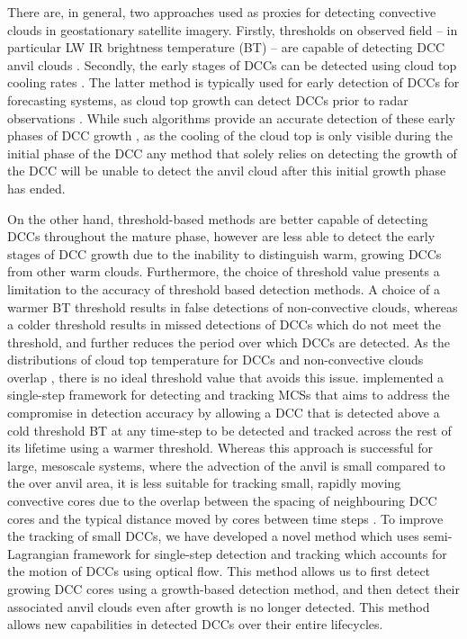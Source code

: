 There are, in general, two approaches used as proxies for detecting convective clouds in geostationary satellite imagery. 
Firstly, thresholds on observed field -- in particular LW IR brightness temperature (BT) -- are capable of detecting DCC anvil clouds \citep[e.g.][]{schmetz_monitoring_1997, hong_detection_2005, schroder_deep_2009, liang_integrated_2017, senf_size-resolved_2018}.
Secondly, the early stages of DCCs can be detected using cloud top cooling rates \citep{zinner_cb-tram:_2008, bedka_objective_2010, muller_novel_2019}.
The latter method is typically used for early detection of DCCs for forecasting systems, as cloud top growth can detect DCCs prior to radar observations \citep{roberts_nowcasting_2003}.
While such algorithms provide an accurate detection of these early phases of DCC growth \citep{zinner_validation_2013}, as the cooling of the cloud top is only visible during the initial phase of the DCC any method that solely relies on detecting the growth of the DCC will be unable to detect the anvil cloud after this initial growth phase has ended.

On the other hand, threshold-based methods are better capable of detecting DCCs throughout the mature phase, however are less able to detect the early stages of DCC growth due to the inability to distinguish warm, growing DCCs from other warm clouds.
Furthermore, the choice of threshold value presents a limitation to the accuracy of threshold based detection methods.
A choice of a warmer BT threshold results in false detections of non-convective clouds, whereas a colder threshold results in missed detections of DCCs which do not meet the threshold, and further reduces the period over which DCCs are detected.
As the distributions of cloud top temperature for DCCs and non-convective clouds overlap \citep{so_classification_2018}, there is no ideal threshold value that avoids this issue.
\citet{fiolleau_algorithm_2013} implemented a single-step framework for detecting and tracking MCSs that aims to address the compromise in detection accuracy by allowing a DCC that is detected above a cold threshold BT at any time-step to be detected and tracked across the rest of its lifetime using a warmer threshold.
Whereas this approach is successful for large, mesoscale systems, where the advection of the anvil is small compared to the over anvil area, it is less suitable for tracking small, rapidly moving convective cores due to the overlap between the spacing of neighbouring DCC cores and the typical distance moved by cores between time steps \citep{heikenfeld_tobac_2019}.
To improve the tracking of small DCCs, we have developed a novel method which uses semi-Lagrangian framework for single-step detection and tracking which accounts for the motion of DCCs using optical flow.
This method allows us to first detect growing DCC cores using a growth-based detection method, and then detect their associated anvil clouds even after growth is no longer detected.
This method allows new capabilities in detected DCCs over their entire lifecycles.

